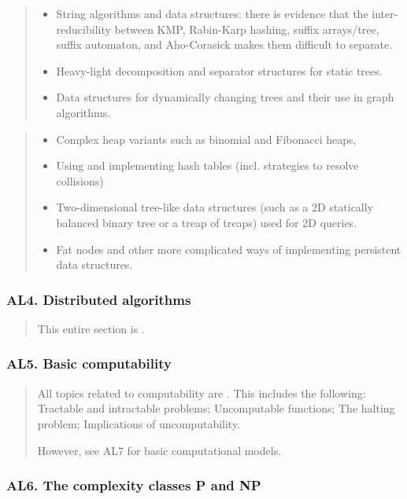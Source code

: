 \documentclass[a4paper,11pt,oneside]{article}
\newcommand{\xmark}{\ding{55}}%
\newcommand{\CC}[1]{#1}
\newcommand{\cnfoc}{{\small\faQuestion}}
\newcommand{\cemay}{{\small\xmark\faQuestionCircle}}
\newcommand{\cexcl}{{\small\xmark}}
\newcommand{\Iexmaybe}{\item[\hbox to 1.8em{\cemay\hfill}]}
\newcommand{\Iexcluded}{\item[\hbox to 1.8em{\cexcl\hfill}]}
\newenvironment{myitemize}{\begin{quote}\begin{itemize}\itemsep 0pt}{\end{itemize}\end{quote}}
\begin{document}
    \begin{myitemize}
    \Iexmaybe String algorithms and data structures: there is evidence that the inter-reducibility between KMP, Rabin-Karp hashing, suffix arrays/tree, suffix automaton, and Aho-Corasick makes them difficult to separate.
    \Iexmaybe Heavy-light decomposition and separator structures for static trees.
    \Iexmaybe Data structures for dynamically changing trees and their use in graph algorithms.
    \end{myitemize}

    \begin{myitemize}
    \Iexcluded Complex heap variants such as binomial and Fibonacci heaps,
    \Iexcluded Using and implementing \CC{hash tables} (incl. strategies to resolve collisions)
    \Iexcluded Two-dimensional tree-like data structures (such as a 2D statically balanced binary tree or a treap of treaps) used for 2D queries.
    \Iexcluded Fat nodes and other more complicated ways of implementing persistent data structures.
    \end{myitemize}

    \subsubsection*{AL4. Distributed algorithms}%

    \begin{quote}
    This entire section is \cnfoc.
    \end{quote}

    \subsubsection*{AL5. Basic computability}%

    \begin{quote}
    All topics related to computability are \cexcl.
    This includes the following:
    \CC{Tractable and intractable problems};
    \CC{Uncomputable functions};
    \CC{The halting problem};
    \CC{Implications of uncomputability}.
    
    However, see AL7 for basic computational models.
    \end{quote}

    \subsubsection*{AL6. The complexity classes P and NP}%
\end{document}
